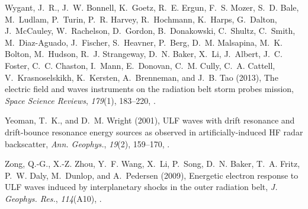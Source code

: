 \documentclass[draft,linenumbers]{agujournal}
\begin{document}
\begin{thebibliography}{62}
Wygant, J.~R., J.~W. Bonnell, K.~Goetz, R.~E. Ergun, F.~S. Mozer, S.~D. Bale,
  M.~Ludlam, P.~Turin, P.~R. Harvey, R.~Hochmann, K.~Harps, G.~Dalton,
  J.~McCauley, W.~Rachelson, D.~Gordon, B.~Donakowski, C.~Shultz, C.~Smith,
  M.~Diaz-Aguado, J.~Fischer, S.~Heavner, P.~Berg, D.~M. Malsapina, M.~K.
  Bolton, M.~Hudson, R.~J. Strangeway, D.~N. Baker, X.~Li, J.~Albert, J.~C.
  Foster, C.~C. Chaston, I.~Mann, E.~Donovan, C.~M. Cully, C.~A. Cattell,
  V.~Krasnoselskikh, K.~Kersten, A.~Brenneman, and J.~B. Tao (2013), The
  electric field and waves instruments on the radiation belt storm probes
  mission, \textit{Space Science Reviews}, \textit{179}(1), 183--220,
  .

Yeoman, T.~K., and D.~M. Wright (2001), {ULF} waves with drift resonance and
  drift-bounce resonance energy sources as observed in artificially-induced
  {HF} radar backscatter, \textit{Ann. Geophys.}, \textit{19}(2), 159--170,
  .

Zong, Q.-G., X.-Z. Zhou, Y.~F. Wang, X.~Li, P.~Song, D.~N. Baker, T.~A. Fritz,
  P.~W. Daly, M.~Dunlop, and A.~Pedersen (2009), Energetic electron response to
  {ULF} waves induced by interplanetary shocks in the outer radiation belt,
  \textit{J. Geophys. Res.}, \textit{114}(A10), .

\end{thebibliography}



%
%
%
%
%
%
%
%
%
%
\end{document}
